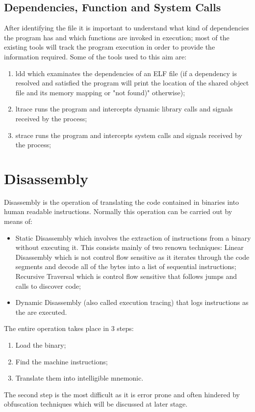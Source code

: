 \subsection{Dependencies, Function and System Calls}
After identifying the file it is important to understand what kind of dependencies the program has and which functions
are invoked in execution; most of the existing tools will track the program execution in order to provide the
information required. Some of the tools used to this aim are:
\begin{enumerate}
    \item {\ttfamily ldd} which examinates the dependencies of an ELF file (if a dependency is resolved and satisfied
        the program will print the location of the shared object file and its memory mapping or "{\ttfamily not found})"
        otherwise);
    \item {\ttfamily ltrace} runs the program and intercepts dynamic library calls and signals received by the process;
    \item {\ttfamily strace} runs the program and intercepts system calls and signals received by the process;
\end{enumerate}



\section{Disassembly}
Disassembly is the operation of translating the code contained in binaries into human readable instructions. Normally
this operation can be carried out by means of:
\begin{itemize}
    \item Static Disassembly which involves the extraction of instructions from a binary without executing it. This
        consists mainly of two renown techniques:
        \subitem Linear Disassembly which is not control flow sensitive as it iterates through the code segments and
        decode all of the bytes into a list of sequential instructions;
        \subitem Recursive Traversal which is control flow sensitive that follows jumps and calls to discover code;
    \item Dynamic Disassembly (also called execution tracing) that logs instructions as the are executed.
\end{itemize}
The entire operation takes place in 3 steps:
\begin{enumerate}
    \item Load the binary;
    \item Find the machine instructions;
    \item Translate them into intelligible mnemonic.
\end{enumerate}
The second step is the most difficult as it is error prone and often hindered by obfuscation techniques which will be
discussed at later stage.


